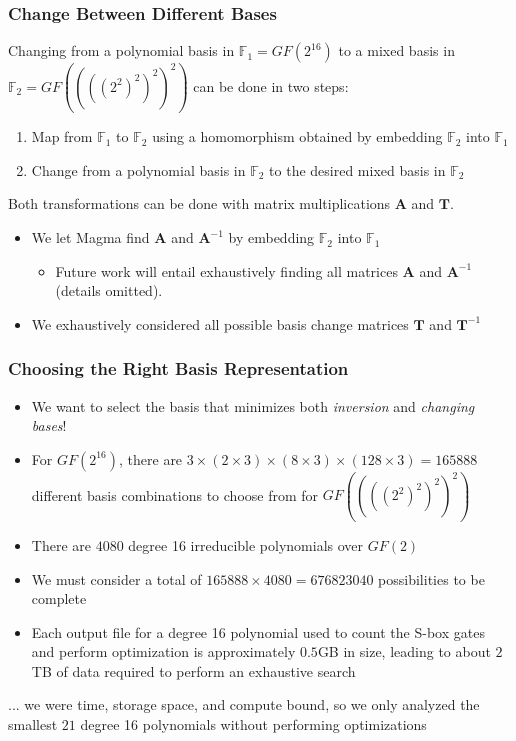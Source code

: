 \documentclass[10pt]{beamer}
\begin{document}
\begin{frame}
	\frametitle{Change Between Different Bases}
	Changing from a polynomial basis in $\mathbb{F}_1 = GF(2^{16})$ to a mixed basis in $\mathbb{F}_2 = GF((((2^2)^2)^2)^2)$ can be done in two steps:
	\begin{enumerate}
		\item Map from $\mathbb{F}_1$ to $\mathbb{F}_2$ using a homomorphism obtained by embedding $\mathbb{F}_2$ into $\mathbb{F}_1$
		\item Change from a polynomial basis in $\mathbb{F}_2$ to the desired mixed basis in $\mathbb{F}_2$
	\end{enumerate}

	\medskip
	\pause
	Both transformations can be done with matrix multiplications $\mathbf{A}$ and $\mathbf{T}$.
	\begin{itemize}
		\item We let Magma find $\mathbf{A}$ and $\mathbf{A}^{-1}$ by embedding $\mathbb{F}_2$ into $\mathbb{F}_1$
		\begin{itemize}
			\item Future work will entail exhaustively finding all matrices $\mathbf{A}$ and $\mathbf{A}^{-1}$ (details omitted).
		\end{itemize}
		\item We exhaustively considered all possible basis change matrices $\mathbf{T}$ and $\mathbf{T}^{-1}$
	\end{itemize}
	
	\medskip
\end{frame}

\begin{frame}
	\frametitle{Choosing the Right Basis Representation}
	\begin{itemize}
		\item We want to select the basis that minimizes both \emph{inversion} and \emph{changing bases}!
		\item For $GF(2^{16})$, there are $3 \times (2 \times 3) \times (8 \times 3) \times (128 \times 3) = 165888$ different basis combinations to choose from for $GF((((2^2)^2)^2)^2)$
		\item There are $4080$ degree 16 irreducible polynomials over $GF(2)$
		\pause
		\item We must consider a total of $165888 \times 4080 = 676823040$ possibilities to be complete
		\item Each output file for a degree 16 polynomial used to count the S-box gates and perform optimization is approximately $0.5$GB in size, leading to about $2$TB of data required to perform an exhaustive search
	\end{itemize}
	\pause
	\begin{center}
	... we were time, storage space, and compute bound, so we only analyzed the smallest $21$ degree 16 polynomials without performing optimizations
	\end{center}
\end{frame}
\end{document}
